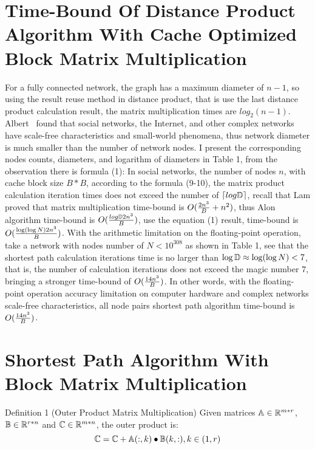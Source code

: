 \documentclass[review]{cvpr}
\begin{document}

\section{Time-Bound Of Distance Product Algorithm With Cache Optimized Block Matrix Multiplication}

For a fully connected network, the graph has a maximum diameter of $n-1$, so using the result reuse method in distance product, that is use the last distance product calculation result, the matrix multiplication times are $log_2(n-1)$.
Albert~\cite{albert1999diameter} found that social networks, the Internet, and other complex networks have scale-free characteristics and small-world phenomena, thus network diameter is much smaller than the number of network nodes.
I present the corresponding nodes counts, diameters, and logarithm of diameters in Table 1, from the observation there is formula (1):
In social networks, the number of nodes $n$, with cache block size $B*B$, according to the formula (9-10), the matrix product calculation iteration times does not exceed the number of $\lceil{log\Bbb D}\rceil$, recall that Lam \etal proved that matrix multiplication time-bound is \(O({2n^3 \over B}+{n^2})\),
thus Alon \etal algorithm time-bound is \(O({log\Bbb D2n^3\over B})\), use the equation (1) result, time-bound is \(O({ \log(\log{N})2n^3\over B})\).
With the arithmetic limitation on the floating-point operation, \eg take a network with nodes number of $N<10^{308}$
as shown in Table 1, see that the shortest path calculation iterations time is no larger than $\log{\Bbb D}\approx{\log(\log{N})}<7$, that is, the number of calculation iterations does not exceed the magic number $7$,
bringing a stronger time-bound of \(O({14n^3\over B})\).
In other words, with the floating-point operation accuracy limitation on computer hardware and complex networks scale-free characteristics, all node pairs shortest path algorithm time-bound is \(O({14n^3\over B})\).




\section{Shortest Path Algorithm With Block Matrix Multiplication}

Definition 1 (Outer Product Matrix Multiplication) Given matrices \(\Bbb A \in \Bbb R^{m*r}\), \(\Bbb B \in \Bbb R^{r*n}\) and \(\Bbb C \in \Bbb R^{m*n}\), the outer product is:
\begin{equation}
\Bbb C = \Bbb C  + \Bbb A(:,k)\bullet \Bbb B(k,:) , k \in (1,r)
\end{equation}
\end{document}
